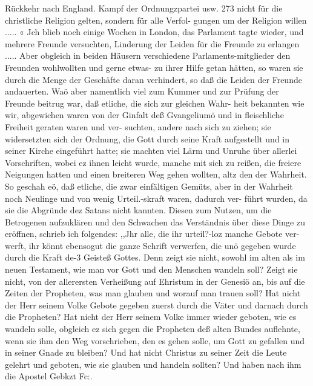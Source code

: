 Rückkehr nach England. Kampf der Ordnungzpartei usw. 273
nicht für die christliche Religion gelten, sondern für alle Verfol-
gungen um der Religion willen ..... «
Jch blieb noch einige Wochen in London, das Parlament tagte
wieder, und mehrere Freunde versuchten, Linderung der Leiden für
die Freunde zu erlangen ..... Aber obgleich in beiden Häusern
verschiedene Parlaments-mitglieder den Freunden wohlwollten und
gerne etwas- zu ihrer Hilfe getan hätten, so waren sie durch die
Menge der Geschäfte daran verhindert, so daß die Leiden der
Freunde andauerten.
Waö aber namentlich viel zum Kummer und zur Prüfung
der Freunde beitrug war, daß etliche, die sich zur gleichen Wahr-
heit bekannten wie wir, abgewichen waren von der Ginfalt deß
Gvangeliumö und in fleischliche Freiheit geraten waren und ver-
suchten, andere nach sich zu ziehen; sie widersetzten sich der
Ordnung, die Gott durch seine Kraft aufgestellt und in seiner
Kirche eingeführt hatte; sie machten viel Lärm und Unruhe über
allerlei Vorschriften, wobei ez ihnen leicht wurde, manche mit
sich zu reißen, die freiere Neigungen hatten und einen breiteren
Weg gehen wollten, altz den der Wahrheit. So geschah eö,
daß etliche, die zwar einfältigen Gemüts, aber in der Wahrheit
noch Neulinge und von wenig Urteil.-skraft waren, dadurch ver-
führt wurden, da sie die Abgründe dez Satans nicht kannten.
Diesen zum Nutzen, um die Betrogenen aufzuklären und den
Schwachen das Verständnis über diese Dinge zu eröffnen, schrieb
ich folgendes: ,,Jhr alle, die ihr urteil?-loz manche Gebote ver-
werft, ihr könnt ebensogut die ganze Schrift verwerfen, die unö
gegeben wurde durch die Kraft de-3 Geisteß Gottes. Denn zeigt
sie nicht, sowohl im alten als im neuen Testament, wie man vor
Gott und den Menschen wandeln soll? Zeigt sie nicht, von der
allerersten Verheißung auf Ehristum in der Genesiö an, bis auf
die Zeiten der Propheten, was man glauben und worauf man
trauen soll? Hat nicht der Herr seinem Volke Gebote gegeben
zuerst durch die Väter und darnach durch die Propheten? Hat
nicht der Herr seinem Volke immer wieder geboten, wie es wandeln
solle, obgleich ez sich gegen die Propheten deß alten Bundes auflehnte,
wenn sie ihm den Weg vorschrieben, den es gehen solle, um Gott
zu gefallen und in seiner Gnade zu bleiben? Und hat nicht
Christus zu seiner Zeit die Leute gelehrt und geboten, wie sie
glauben und handeln sollten? Und haben nach ihm die Apostel
Gebkzt Fc:.  


